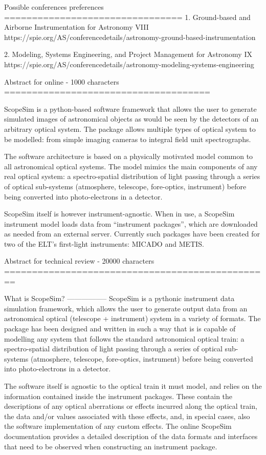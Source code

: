Possible conferences preferences
================================
1. Ground-based and Airborne Instrumentation for Astronomy VIII
https://spie.org/AS/conferencedetails/astronomy-ground-based-instrumentation

2. Modeling, Systems Engineering, and Project Management for Astronomy IX
https://spie.org/AS/conferencedetails/astronomy-modeling-systems-engineering


Abstract for online - 1000 characters
=====================================

ScopeSim is a python-based software framework that allows the user to generate
simulated images of astronomical objects as would be seen by the detectors of
an arbitrary optical system. The package allows multiple types of optical system
to be modelled: from simple imaging cameras to integral field unit
spectrographs.

The software architecture is based on a physically motivated model common to all
astronomical optical systems. The model mimics the main components of any real
optical system: a spectro-spatial distribution of light passing through a series
of optical sub-systems (atmosphere, telescope, fore-optics, instrument) before
being converted into photo-electrons in a detector.

ScopeSim itself is however instrument-agnostic. When in use, a ScopeSim
instrument model loads data from ``instrument packages'', which are
downloaded as needed from an external server. Currently such packages have been
created for two of the ELT's first-light instruments: MICADO and METIS.


Abstract for technical review - 20000 characters
================================================

What is ScopeSim?
-----------------
ScopeSim is a pythonic instrument data simulation framework, which allows the
user to generate output data from an astronomical optical (telescope +
instrument) system in a variety of formats. The package has been designed and
written in such a way that is is capable of modelling any system that follows
the standard astronomical optical train: a spectro-spatial distribution of light
passing through a series of optical sub-systems (atmosphere, telescope,
fore-optics, instrument) before being converted into photo-electrons in a
detector.

The software itself is agnostic to the optical train it must model, and
relies on the information contained inside the instrument packages.
These contain the descriptions of any optical aberrations or effects incurred
along the optical train, the data and/or values associated with these
effects, and, in special cases, also the software implementation of any
custom effects. The online ScopeSim documentation provides a detailed
description of the data formats and interfaces that need to be observed when
constructing an instrument package.

